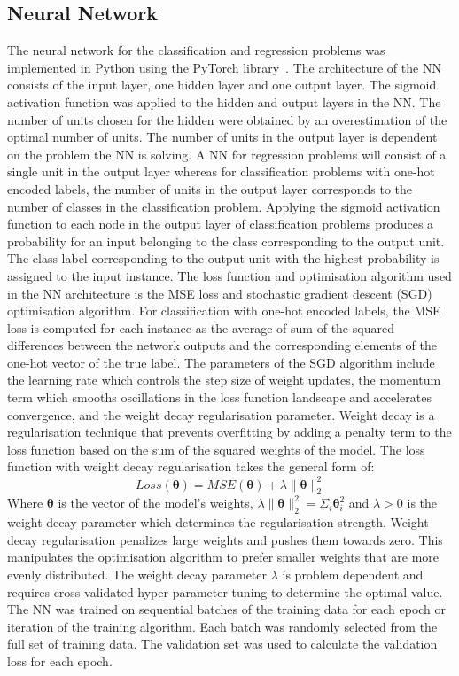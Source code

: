 \documentclass[conference]{IEEEtran}
\begin{document}
	\subsection{Neural Network}
	The neural network for the classification and regression problems was implemented in Python using the PyTorch library~\cite{paszke2019pytorch}. The architecture of the NN consists of the input layer, one hidden layer and one output layer. The sigmoid activation function was applied to the hidden and output layers in the NN. The number of units chosen for the hidden were obtained by an overestimation of the optimal number of units. The number of units in the output layer is dependent on the problem the NN is solving. A NN for regression problems will consist of a single unit in the output layer whereas for classification problems with one-hot encoded labels, the number of units in the output layer corresponds to the number of classes in the classification problem. Applying the sigmoid activation function to each node in the output layer of classification problems produces a probability for an input belonging to the class corresponding to the output unit. The class label corresponding to the output unit with the highest probability is assigned to the input instance. The loss function and optimisation algorithm used in the NN architecture is the MSE loss and stochastic gradient descent (SGD) optimisation algorithm. For classification with one-hot encoded labels, the MSE loss is computed for each instance as the average of sum of the squared differences between the network outputs and the corresponding elements of the one-hot vector of the true label. The parameters of the SGD algorithm include the learning rate which controls the step size of weight updates, the momentum term which smooths oscillations in the loss function landscape and accelerates convergence, and the weight decay regularisation parameter. Weight decay is a regularisation technique that prevents overfitting by adding a penalty term to the loss function based on the sum of the squared weights of the model. The loss function with weight decay regularisation takes the general form of:
	$$
	Loss(\boldsymbol{\theta}) = MSE(\boldsymbol{\theta}) + \lambda\lVert\boldsymbol{\theta}\lVert_2^2
	$$
	Where $\boldsymbol{\theta}$ is the vector of the model's weights, $\lambda\lVert\boldsymbol{\theta}\lVert_2^2=\Sigma_{i}\boldsymbol{\theta}_i^2$ and $\lambda > 0$ is the weight decay parameter which determines the regularisation strength. Weight decay regularisation penalizes large weights and pushes them towards zero. This manipulates the optimisation algorithm to prefer smaller weights that are more evenly distributed. The weight decay parameter $\lambda$ is problem dependent and requires cross validated hyper parameter tuning to determine the optimal value. The NN was trained on sequential batches of the training data for each epoch or iteration of the training algorithm. Each batch was randomly selected from the full set of training data. The validation set was used to calculate the validation loss for each epoch. 
	
\end{document}
